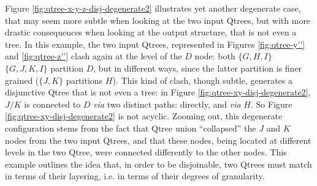 \begin{exe}
	\label{ex:orthogonality}
	\label{ex:orthogonality-relevance}
\end{exe}

Figure \ref{fig:qtree-x-y-z-disj-degenerate2} illustrates yet another degenerate case, that may seem more subtle when looking at the two input Qtrees, but with more drastic consequences when looking at the output structure, that is not even a tree. In this example, the two input Qtrees, represented in Figures \ref{fig:qtree-y''} and \ref{fig:qtree-z''} clash again at the level of the $D$ node: both $\lbrace G, H, I \rbrace$ $\lbrace G, J, K, I \rbrace$ partition $D$, but in different ways, since the latter partition is finer grained ($\lbrace J, K\rbrace$ partitions $H$). This kind of clash, though subtle, generates a disjunctive Qtree that is not even a tree: in Figure \ref{fig:qtree-xy-disj-degenerate2}, $J$/$K$ is connected to $D$ \textit{via} two distinct paths: directly, and \textit{via} $H$. So Figure \ref{fig:qtree-xy-disj-degenerate2} is not acyclic. Zooming out, this degenerate configuration stems from the fact that Qtree union ``collapsed'' the $J$ and $K$ nodes from the two input Qtrees, and that these nodes, being located at different levels in the two Qtree, were connected differently to the other nodes. This example outlines the idea that, in order to be disjoinable, two Qtrees must match in terms of their layering, i.e. in terms of their degrees of granularity.

